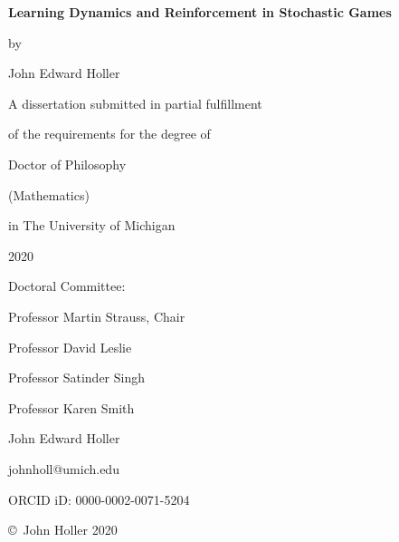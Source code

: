 

\vspace*{1.5in}
\begin{center}
	{\bf Learning Dynamics and Reinforcement in Stochastic Games}

\vspace{2mm}
by

\vspace{5mm}
John Edward Holler

\vspace{1.25in}
A dissertation submitted in partial fulfillment

of the requirements for the degree of

Doctor of Philosophy

(Mathematics)

in The University of Michigan

2020
\end{center}

\vspace{1.25in}
\noindent Doctoral Committee:

\vspace{.15 in}

Professor Martin Strauss, Chair

Professor David Leslie

Professor Satinder Singh

Professor Karen Smith



\thispagestyle{empty}

\newpage
\thispagestyle{empty}

\vspace*{2in}
\begin{center}
	John Edward Holler
	
	\vspace{5mm}
	johnholl@umich.edu
	
	\vspace{5mm}
	ORCID iD: 0000-0002-0071-5204
	
	\vspace{1cm}
	\copyright\, John Holler 2020
\end{center}
\restoregeometry

